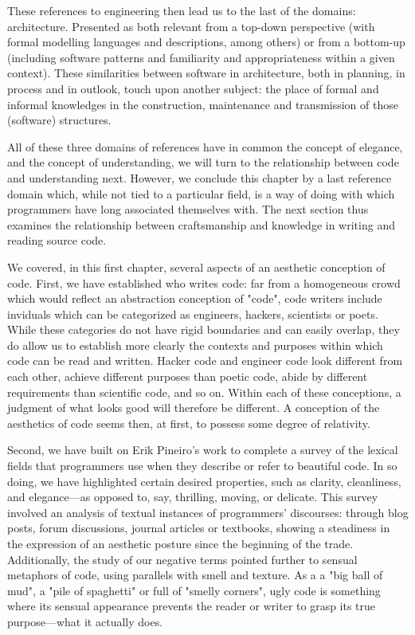 These references to engineering then lead us to the last of the domains: architecture. Presented as both relevant from a top-down perspective (with formal modelling languages and descriptions, among others) or from a bottom-up (including software patterns and familiarity and appropriateness within a given context). These similarities between software in architecture, both in planning, in process and in outlook, touch upon another subject: the place of formal and informal knowledges in the construction, maintenance and transmission of those (software) structures.

All of these three domains of references have in common the concept of elegance, and the concept of understanding, we will turn to the relationship between code and understanding next. However, we conclude this chapter by a last reference domain which, while not tied to a particular field, is a way of doing with which programmers have long associated themselves with. The next section thus examines the relationship between craftsmanship and knowledge in writing and reading source code.

\pagebreak

We covered, in this first chapter, several aspects of an aesthetic conception of code. First, we have established who writes code: far from a homogeneous crowd which would reflect an abstraction conception of "code", code writers include inviduals which can be categorized as engineers, hackers, scientists or poets. While these categories do not have rigid boundaries and can easily overlap, they do allow us to establish more clearly the contexts and purposes within which code can be read and written. Hacker code and engineer code look different from each other, achieve different purposes than poetic code, abide by different requirements than scientific code, and so on. Within each of these conceptions, a judgment of what looks good will therefore be different. A conception of the aesthetics of code seems then, at first, to possess some degree of relativity.

Second, we have built on Erik Pineiro's work to complete a survey of the lexical fields that programmers use when they describe or refer to beautiful code. In so doing, we have highlighted certain desired properties, such as clarity, cleanliness, and elegance—as opposed to, say, thrilling, moving, or delicate. This survey involved an analysis of textual instances of programmers' discourses: through blog posts, forum discussions, journal articles or textbooks, showing a steadiness in the expression of an aesthetic posture since the beginning of the trade. Additionally, the study of our negative terms pointed further to sensual metaphors of code, using parallels with smell and texture. As a a "big ball of mud", a "pile of spaghetti" or full of "smelly corners", ugly code is something where its sensual appearance prevents the reader or writer to grasp its true purpose—what it actually does.

